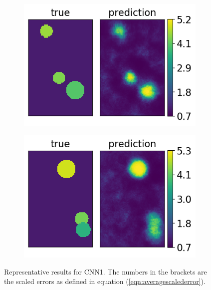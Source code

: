 \documentclass[12pt]{article}
\newcommand{\nhgcnnwidth}{0.48\linewidth}
\newcommand{\nhgcnnheight}{4.0cm}
\begin{document}
%
\begin{figure}[!h]
  \centering
  \begin{subfigure}[c]{\nhgcnnwidth}
    \centering
    \includegraphics[totalheight=\nhgcnnheight]{Figures/AppendixNew/CNN1/ex3/mu.png}
  \end{subfigure}
  \begin{subfigure}[c]{\nhgcnnwidth}
    \centering
    \includegraphics[totalheight=\nhgcnnheight]{Figures/AppendixNew/CNN1/ex4/mu.png}
  \end{subfigure}
\caption{\label{fig:cnn1result} Representative results for CNN1. The numbers in the brackets are the scaled errors as defined in equation (\ref{eqn:averagescalederror}).}  
\end{figure}
%
\end{document}
